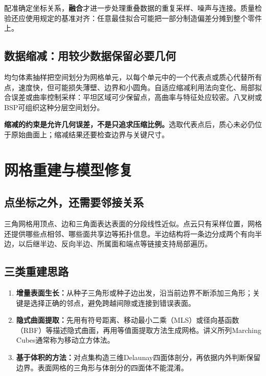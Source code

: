 配准确定坐标关系，\textbf{融合}才进一步处理重叠数据的重复采样、噪声与连接。质量检验还应使用规定的基准对齐：任意最佳拟合可能把一部分制造偏差分摊到整个零件上。

\subsection{数据缩减：用较少数据保留必要几何}
均匀体素抽样把空间划分为网格单元，以每个单元中的一个代表点或质心代替所有点，速度快，但可能损失薄壁、边界和小圆角。自适应缩减利用法向变化、局部拟合误差或曲率控制采样：平坦区域可少保留点，高曲率与特征处应较密。八叉树或BSP可组织这种分层空间划分。

\textbf{缩减的约束是允许几何误差，不是只追求压缩比例。}选取代表点后，质心未必仍位于原始曲面上；缩减结果还要检查边界与关键尺寸。

\section{网格重建与模型修复}
\subsection{点坐标之外，还需要邻接关系}
三角网格用顶点、边和三角面表达表面的分段线性近似。点云只有采样位置，网格还提供哪些点相邻、哪些面共享边等拓扑信息。半边结构将一条边分成两个有向半边，以后继半边、反向半边、所属面和端点等链接支持局部遍历。



\subsection{三类重建思路}
\begin{enumerate}
\item \textbf{增量表面生长：}从种子三角形或种子边出发，沿当前边界不断添加三角形；关键是选择正确的邻点，避免跨越间隙或连接到错误表面。
\item \textbf{隐式曲面提取：}先用有符号距离、移动最小二乘（MLS）或径向基函数（RBF）等描述隐式曲面，再用等值面提取方法生成网格。讲义所列Marching Cubes通常称为移动立方体法。
\item \textbf{基于体积的方法：}对点集构造三维Delaunay四面体剖分，再依据内外判断保留边界。表面网格的三角形与体剖分的四面体不能混淆。
\end{enumerate}

